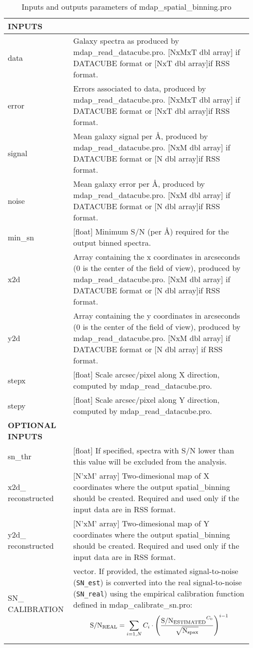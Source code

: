 \begin{center}
\begin{longtable}{p{2.7cm}| p{11.1cm} }
\caption{Inputs and outputs parameters of mdap\_spatial\_binning.pro} \label{dap_tab:mdap_spatial_binning} \\
\hline
\endfirsthead
\hline
\endhead
\hline
\endlastfoot
\hline
{\bf  INPUTS} & \\
\hline
data   &    Galaxy spectra as produced by mdap\_read\_datacube.pro.
           [NxMxT dbl array] if DATACUBE format or [NxT dbl array]if RSS format.\\
%
error  &    Errors associated to data, produced by mdap\_read\_datacube.pro.
           [NxMxT dbl array] if DATACUBE format or [NxT dbl array]if RSS format.\\
%
signal  &   Mean galaxy signal per \AA, produced by mdap\_read\_datacube.pro.
           [NxM dbl array] if DATACUBE format or [N dbl array]if RSS format.\\
%
noise  &    Mean galaxy error per \AA,  produced by mdap\_read\_datacube.pro. 
           [NxM dbl array] if DATACUBE format or [N dbl array]if RSS format.\\
%
min\_sn &    [float] Minimum S/N (per \AA) required for the output binned spectra.\\
%
x2d   &     Array containing the x coordinates in arcseconds (0 is the center of the field of view), produced by  mdap\_read\_datacube.pro.    
            [NxM dbl array] if DATACUBE format or [N dbl array]if RSS format.\\
%
y2d   &     Array containing the y coordinates in arcseconds (0 is the center of the field of view), produced by  mdap\_read\_datacube.pro.    
           [NxM dbl array] if DATACUBE format or [N dbl array] if RSS format.\\
%
stepx  &    [float] Scale arcsec/pixel along X direction, computed by  mdap\_read\_datacube.pro. \\
%
stepy   &   [float] Scale arcsec/pixel along Y direction, computed by  mdap\_read\_datacube.pro. \\
%
\hline
{\bf OPTIONAL INPUTS} & \\
\hline
%
sn\_thr   &  [float] If specified, spectra with S/N lower than this value will be excluded from the analysis. \\ 
%
x2d\_ reconstructed & [N'xM' array] Two-dimesional map of X coordinates where the output spatial\_binning should be created. Required and used only  
                    if the input data are in RSS format. \\
%
y2d\_ reconstructed & [N'xM' array] Two-dimesional map of Y coordinates where the output spatial\_binning should be created. Required and used only 
                    if the input data are in RSS format. \\
%
SN\_ CALIBRATION    & vector. If provided, the estimated signal-to-noise ({\tt SN\_est}) is converted into the real signal-to-noise ({\tt SN\_real}) using the empirical
                  calibration function defined in mdap\_calibrate\_sn.pro:
           \[
           {\rm S/N_{REAL}} = \sum_{i=1,N} C_i \cdot \left( \frac{{\rm S/N_{ESTIMATED}}^{C_0}}{ \sqrt{{\rm N}_{\rm spax} }} \right)^{i-1} 
            \]


\end{longtable}
\end{center}
